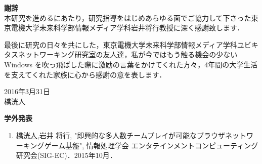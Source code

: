 \newpage
\pagestyle{empty}


\begin{flushleft}
{\huge{\bf 謝辞}}\\
\vspace{1cm}
本研究を進めるにあたり，研究指導をはじめあらゆる面でご協力して下さった東京電機大学未来科学部情報メディア学科岩井将行教授に深く感謝致します．
\par
最後に研究の日々を共にした，東京電機大学未来科学部情報メディア学科ユビキタスネットワーキング研究室の友人達，私が今ではもう触る機会の少ない Windows を吹っ飛ばした際に激励の言葉をかけてくれた方々，4年間の大学生活を支えてくれた家族に心から感謝の意を表します．\\

\vspace{3cm}
\begin{flushright}
2016年3月31日\\
橋洸人\\
\end{flushright}
\end{flushleft}



\newpage




\begin{flushleft}
{\huge{\bf 学外発表}}\\
\vspace{1cm}
\begin{enumerate}
	
\item \underline{橋洸人},岩井 将行, "即興的な多人数チームプレイが可能なブラウザネットワーキングゲーム基盤", 情報処理学会 エンタテインメントコンピューティング研究会(SIG-EC)．2015年10月．

\end{enumerate}
\end{flushleft}

\newpage

\renewcommand{\bibname}{参考文献}

